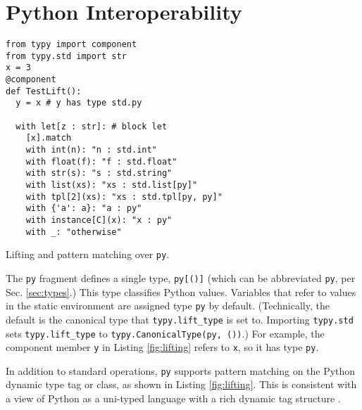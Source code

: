 \documentclass[10pt]{sigplanconf}
\newcommand{\lip}[1]{\lstinline[language=Python,basicstyle=\ttfamily\footnotesize,morekeywords={with},deletendkeywords={tuple,buffer,map}]{#1}}
\newcommand{\li}[1]{\lip{#1}}
\begin{document}

\section{Python Interoperability}\label{appendix:py}
\begin{codelisting}[h!]
\begin{lstlisting}
from typy import component
from typy.std import str
x = 3
@component
def TestLift():
  y = x # y has type std.py

  with let[z : str]: # block let
    [x].match
    with int(n): "n : std.int"
    with float(f): "f : std.float"
    with str(s): "s : std.string"
    with list(xs): "xs : std.list[py]"
    with tpl[2](xs): "xs : std.tpl[py, py]"
    with {'a': a}: "a : py"
    with instance[C](x): "x : py"
    with _: "otherwise"
\end{lstlisting}
\caption{Lifting and pattern matching over \li{py}.}
\label{fig:lifting}
\end{codelisting}

\noindent The \li{py} fragment defines a single type, \li{py[()]} (which can be abbreviated \li{py}, per Sec. \ref{sec:types}.) This type classifies Python values. Variables that refer to values in the static environment  are assigned type \li{py} by default. (Technically, the default is the canonical type that \li{typy.lift_type} is set to. Importing \li{typy.std} sets \li{typy.lift_type} to \li{typy.CanonicalType(py, ())}.) 
 For example, the component member \li{y} in Listing \ref{fig:lifting} refers to \li{x}, so it has type \li{py}.

In addition to standard operations, \li{py} supports pattern matching on the Python dynamic type tag or class, as shown in Listing \ref{fig:lifting}. This is consistent with a view of Python as a uni-typed language with a rich dynamic tag structure \cite{pfpl,scott1980lambda}. 
\end{document}
